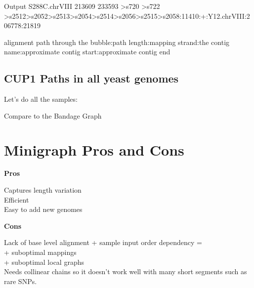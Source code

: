 \documentclass[
]{book}
\newenvironment{Shaded}{\begin{snugshade}}{\end{snugshade}}
\newcommand{\AttributeTok}[1]{\textcolor[rgb]{0.77,0.63,0.00}{#1}}
\newcommand{\ControlFlowTok}[1]{\textcolor[rgb]{0.13,0.29,0.53}{\textbf{#1}}}
\newcommand{\ExtensionTok}[1]{#1}
\newcommand{\FunctionTok}[1]{\textcolor[rgb]{0.00,0.00,0.00}{#1}}
\newcommand{\KeywordTok}[1]{\textcolor[rgb]{0.13,0.29,0.53}{\textbf{#1}}}
\newcommand{\NormalTok}[1]{#1}
\newcommand{\OperatorTok}[1]{\textcolor[rgb]{0.81,0.36,0.00}{\textbf{#1}}}
\newcommand{\PreprocessorTok}[1]{\textcolor[rgb]{0.56,0.35,0.01}{\textit{#1}}}
\newcommand{\VariableTok}[1]{\textcolor[rgb]{0.00,0.00,0.00}{#1}}
\begin{document}
Output
S288C.chrVIII 213609 233593 \textgreater s720 \textgreater s722 \textgreater s2512\textgreater s2052\textgreater s2513\textgreater s2054\textgreater s2514\textgreater s2056\textgreater s2515\textgreater s2058:11410:+:Y12.chrVIII:206778:21819

alignment path through the bubble:path length:mapping strand:the contig name:approximate contig start:approximate contig end

\hypertarget{cup1-paths-in-all-yeast-genomes}{%
\subsection*{CUP1 Paths in all yeast genomes}\label{cup1-paths-in-all-yeast-genomes}}

Let's do all the samples:

\begin{Shaded}
\end{Shaded}

Compare to the Bandage Graph

\hypertarget{minigraph-pros-and-cons}{%
\section{Minigraph Pros and Cons}\label{minigraph-pros-and-cons}}

\textbf{Pros}

Captures length variation\\
Efficient\\
Easy to add new genomes

\textbf{Cons}

Lack of base level alignment + sample input order dependency =\\
+ suboptimal mappings\\
+ suboptimal local graphs\\
Needs collinear chains so it doesn't work well with many short segments such as rare SNPs.
\end{document}
